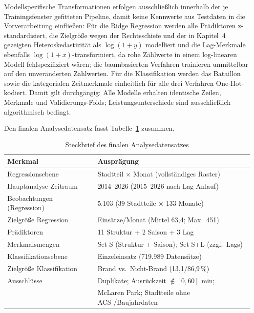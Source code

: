 Modellspezifische Transformationen erfolgen ausschließlich innerhalb der je
Trainingsfenster gefitteten Pipeline, damit keine Kennwerte aus Testdaten in
die Vorverarbeitung einfließen: Für die Ridge Regression werden alle
Prädiktoren z-standardisiert, die Zielgröße wegen der Rechtsschiefe und der
in Kapitel~4 gezeigten Heteroskedastizität als $\log(1+y)$ modelliert und
die Lag-Merkmale ebenfalls $\log(1+x)$-transformiert, da rohe Zählwerte in
einem log-linearen Modell fehlspezifiziert wären; die baumbasierten
Verfahren trainieren unmittelbar auf den unveränderten Zählwerten. Für die
Klassifikation werden das Bataillon sowie die kategorialen Zeitmerkmale
einheitlich für alle drei Verfahren One-Hot-kodiert. Damit gilt
durchgängig: Alle Modelle erhalten identische Zeilen, Merkmale und
Validierungs-Folds; Leistungsunterschiede sind ausschließlich algorithmisch
bedingt.

Den finalen Analysedatensatz fasst Tabelle~\ref{tab:steckbrief} zusammen.

\begin{table}[htbp]
  \centering
  \caption{Steckbrief des finalen Analysedatensatzes}
  \label{tab:steckbrief}
  \begin{tabular}{ll}
    \hline
    \textbf{Merkmal} & \textbf{Ausprägung} \\
    \hline
    Regressionsebene & Stadtteil $\times$ Monat (vollständiges Raster) \\
    Hauptanalyse-Zeitraum & 2014--2026 (2015--2026 nach Lag-Anlauf) \\
    Beobachtungen (Regression) & 5.103 (39 Stadtteile $\times$ 133 Monate) \\
    Zielgröße Regression & Einsätze/Monat (Mittel 63,4; Max.\ 451) \\
    Prädiktoren & 11 Struktur + 2 Saison + 3 Lag \\
    Merkmalsmengen & Set S (Struktur + Saison); Set S+L (zzgl.\ Lags) \\
    Klassifikationsebene & Einzeleinsatz (719.989 Datensätze) \\
    Zielgröße Klassifikation & Brand vs.\ Nicht-Brand (13,1/86,9\,\%) \\
    Ausschlüsse & Duplikate; Ausrückzeit $\notin [0,60]$ min; \\
                & McLaren Park; Stadtteile ohne ACS-/Baujahrdaten \\
    \hline
  \end{tabular}
\end{table}
